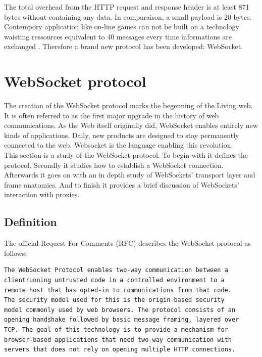 The total overhead from the HTTP request and response header is at least 871
bytes without containing any data. In comparaison, a small payload is 20 bytes.
Contempory application like on-line games can not be built on a technology
waisting ressources equivalent to 40 messages every time informations are
exchanged \citep{Reference2}. Therefore a brand new protocol has been
developed: WebSocket.\\

\section{WebSocket protocol}

The creation of the WebSocket protocol marks the begenning of the Living web.
It is often referred to as the first major upgrade in the history of web
communications. As the Web itself originally did, WebSocket enables entirely
new kinds of applications. Daily, new products are designed to stay permanently
connected to the web. Websocket is the language enabling this revolution.\\

This section is a study of the WebSocket protocol. To begin with it defines the
protocol. Secondly it studies how to establish a WebSocket connection.
Afterwards it goes on with an in depth study of WebSockets' transport layer and
frame anatomies. And to finish it provides a brief discussion of WebSockets'
interaction with proxies.

\subsection{Definition}

The official Request For Comments \citep{Reference12} (RFC) describes the
WebSocket protocol as follows:

\begin{verbatim}
The WebSocket Protocol enables two-way communication between a 
clientrunning untrusted code in a controlled environment to a 
remote host that has opted-in to communications from that code.
The security model used for this is the origin-based security 
model commonly used by web browsers. The protocol consists of an
opening handshake followed by basic message framing, layered over
TCP. The goal of this technology is to provide a mechanism for
browser-based applications that need two-way communication with
servers that does not rely on opening multiple HTTP connections.
\end{verbatim}

